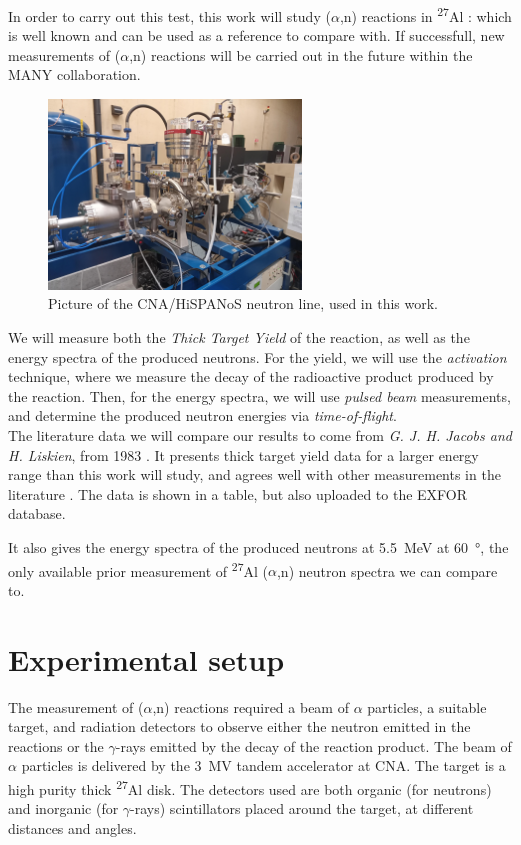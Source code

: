 \documentclass[a4paper,12pt]{report}
\newcommand{\an}{($\alpha$,n) }
\newcommand{\Aliso}{\textsuperscript{27}Al }
\begin{document}
In order to carry out this test, this work will study \an reactions in \Aliso: which is well known and can be used as a reference to compare with.
If successfull, new measurements of \an reactions will be carried out in the future within the MANY collaboration.
\\

\begin{figure}[H]
	\centering
	\includegraphics[width=0.6\textwidth]{neutronline_foto.jpg}
	\caption{Picture of the CNA/HiSPANoS neutron line, used in this work.}
	\label{neutronline_foto}
\end{figure}

We will measure both the \textit{Thick Target Yield} of the reaction, as well as the energy spectra of the produced neutrons.
For the yield, we will use the \textit{activation} technique, where we measure the decay of the radioactive product produced by the reaction.
Then, for the energy spectra, we will use \textit{pulsed beam} measurements, and determine the produced neutron energies via \textit{time-of-flight}.
\\

The literature data we will compare our results to come from \textit{G. J. H. Jacobs and H. Liskien}, from 1983 \cite{jacobs}.
It presents thick target yield data for a larger energy range than this work will study, and agrees well with other measurements in the literature \cite{jacobssupport1, jacobssupport2}.
The data is shown in a table, but also uploaded to the EXFOR database.

It also gives the energy spectra of the produced neutrons at \qty{5.5}{\MeV} at \qty{60}{\degree}, the only available prior measurement of \Aliso\an neutron spectra we can compare to.


\chapter{Experimental setup}
The measurement of \an reactions required a beam of $\alpha$ particles, a suitable target, and radiation detectors to observe either the neutron emitted in the reactions or the $\gamma$-rays emitted by the decay of the reaction product.
The beam of $\alpha$ particles is delivered by the \qty{3}{\mega\volt} tandem accelerator at CNA.
The target is a high purity thick \Aliso disk.
The detectors used are both organic (for neutrons) and inorganic (for $\gamma$-rays) scintillators placed around the target, at different distances and angles.
\end{document}
